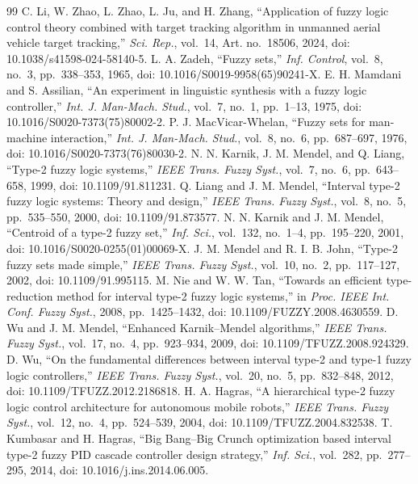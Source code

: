 \documentclass[conference,a4paper]{IEEEtran}
\begin{document}
\begin{thebibliography}{99}
 C. Li, W. Zhao, L. Zhao, L. Ju, and H. Zhang, ``Application of fuzzy logic control theory combined with target tracking algorithm in unmanned aerial vehicle target tracking,'' \emph{Sci. Rep.}, vol.~14, Art. no.~18506, 2024, doi: 10.1038/s41598-024-58140-5.
 L. A. Zadeh, ``Fuzzy sets,'' \emph{Inf. Control}, vol.~8, no.~3, pp.~338--353, 1965, doi: 10.1016/S0019-9958(65)90241-X.
 E. H. Mamdani and S. Assilian, ``An experiment in linguistic synthesis with a fuzzy logic controller,'' \emph{Int. J. Man-Mach. Stud.}, vol.~7, no.~1, pp.~1--13, 1975, doi: 10.1016/S0020-7373(75)80002-2.
 P. J. MacVicar-Whelan, ``Fuzzy sets for man-machine interaction,'' \emph{Int. J. Man-Mach. Stud.}, vol.~8, no.~6, pp.~687--697, 1976, doi: 10.1016/S0020-7373(76)80030-2.
 N. N. Karnik, J. M. Mendel, and Q. Liang, ``Type-2 fuzzy logic systems,'' \emph{IEEE Trans. Fuzzy Syst.}, vol.~7, no.~6, pp.~643--658, 1999, doi: 10.1109/91.811231.
 Q. Liang and J. M. Mendel, ``Interval type-2 fuzzy logic systems: Theory and design,'' \emph{IEEE Trans. Fuzzy Syst.}, vol.~8, no.~5, pp.~535--550, 2000, doi: 10.1109/91.873577.
 N. N. Karnik and J. M. Mendel, ``Centroid of a type-2 fuzzy set,'' \emph{Inf. Sci.}, vol.~132, no.~1--4, pp.~195--220, 2001, doi: 10.1016/S0020-0255(01)00069-X.
 J. M. Mendel and R. I. B. John, ``Type-2 fuzzy sets made simple,'' \emph{IEEE Trans. Fuzzy Syst.}, vol.~10, no.~2, pp.~117--127, 2002, doi: 10.1109/91.995115.
 M. Nie and W. W. Tan, ``Towards an efficient type-reduction method for interval type-2 fuzzy logic systems,'' in \emph{Proc. IEEE Int. Conf. Fuzzy Syst.}, 2008, pp.~1425--1432, doi: 10.1109/FUZZY.2008.4630559.
 D. Wu and J. M. Mendel, ``Enhanced Karnik--Mendel algorithms,'' \emph{IEEE Trans. Fuzzy Syst.}, vol.~17, no.~4, pp.~923--934, 2009, doi: 10.1109/TFUZZ.2008.924329.
 D. Wu, ``On the fundamental differences between interval type-2 and type-1 fuzzy logic controllers,'' \emph{IEEE Trans. Fuzzy Syst.}, vol.~20, no.~5, pp.~832--848, 2012, doi: 10.1109/TFUZZ.2012.2186818.
 H. A. Hagras, ``A hierarchical type-2 fuzzy logic control architecture for autonomous mobile robots,'' \emph{IEEE Trans. Fuzzy Syst.}, vol.~12, no.~4, pp.~524--539, 2004, doi: 10.1109/TFUZZ.2004.832538.
 T. Kumbasar and H. Hagras, ``Big Bang--Big Crunch optimization based interval type-2 fuzzy PID cascade controller design strategy,'' \emph{Inf. Sci.}, vol.~282, pp.~277--295, 2014, doi: 10.1016/j.ins.2014.06.005.

\end{thebibliography}
\end{document}
